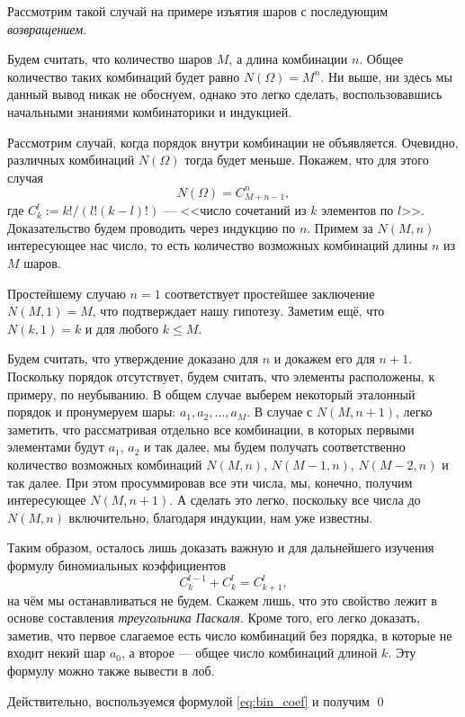 Рассмотрим такой случай на примере изъятия шаров с последующим
\emph{возвращением}.
\begin{ex}
	Будем считать, что количество шаров $ M $, а длина комбинации $ n $. Общее количество таких
	комбинаций будет равно $ N(\Omega) = M^n $. Ни выше, ни здесь мы данный вывод
	никак не обоснуем, однако это легко сделать, воспользовавшись начальными
	знаниями комбинаторики и индукцией.

	Рассмотрим случай, когда порядок внутри комбинации не объявляется. Очевидно,
	различных комбинаций $ N(\Omega) $ тогда будет меньше. Покажем, что для этого
	случая  
	\[
		N(\Omega) = C^n_{M+n-1},
	\]
	где $ C^l_k := k!/(l!(k-l)!) $ --- <<число сочетаний из $ k $ элементов по $ l
	$>>. Доказательство будем проводить через индукцию по $ n $. Примем за $ N(M,
n) $ интересующее нас число, то есть количество возможных комбинаций длины $n$
из $ M $
шаров. 

	Простейшему случаю $ n = 1 $ соответствует простейшее заключение $ N(M, 1) = M
	$, что подтверждает нашу гипотезу. Заметим ещё, что $ N(k, 1) = k $ и для
	любого $ k \leqslant M $.

	Будем считать, что утверждение доказано для $ n $ и докажем его для $ n + 1 $.
	Поскольку порядок отсутствует, будем считать, что элементы расположены, к
	примеру, по неубыванию. В общем случае выберем некоторый эталонный порядок и
	пронумеруем шары: $ a_1, a_2, \dots, a_M $. В случае с $ N(M, n+1) $, легко заметить, что
	рассматривая отдельно все комбинации, в которых первыми элементами будут $ a_1
	$, $a_2$ и так далее, мы будем получать соответственно количество возможных
	комбинаций $ N(M, n)$, $N(M-1, n)$, $ N(M-2, n) $ и так далее. При этом просуммировав все
	эти числа, мы, конечно, получим интересующее $ N(M,n+1) $. А сделать это
	легко, поскольку все числа до $N(M, n)$ включительно, благодаря индукции, нам
	уже известны.

	Таким образом, осталось лишь доказать важную и для дальнейшего изучения
	формулу биномиальных коэффициентов
	\begin{equation}
		\label{eq:bin_coef}
		C^{l-1}_k + C^l_k = C^l_{k+1},
	\end{equation}
на чём мы останавливаться не будем. Скажем лишь, что это свойство лежит в основе
составления \emph{треугольника Паскаля}. Кроме того,  его легко доказать, заметив,
что первое слагаемое есть число комбинаций без порядка, в которые не входит
некий шар $ a_0 $, а второе --- общее число комбинаций длиной $ k $. Эту формулу
можно также вывести в лоб. 

Действительно, воспользуемся формулой \eqref{eq:bin_coef} и получим \qed
\end{ex}

